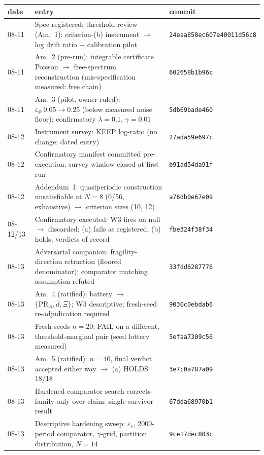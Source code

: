 \documentclass[a4paper,11pt,noarxiv]{quantumarticle}
\newcommand{\ephi}{\varepsilon_\Phi}
\begin{document}
\begin{table}[t]
\centering\footnotesize
\begin{tabular}{@{}p{1.25cm}p{9.55cm}p{2.55cm}@{}}
\toprule
date & entry & commit \\
\midrule
08-11 & Spec registered; threshold review (Am.~1): criterion-(b)
instrument $\to$ log drift ratio + calibration pilot &
\texttt{24eaa858ec60}\newline\texttt{7e40011d56c8} \\
08-11 & Am.~2 (pre-run): integrable certificate Poisson $\to$
free-spectrum reconstruction (mis-specification measured: free chain) &
\texttt{602658b1b96c} \\
08-11 & Am.~3 (pilot, owner-ruled): $\ephi\ 0.05 \to 0.25$ (below
measured noise floor); confirmatory $\lambda=0.1$, $\gamma=0.01$ &
\texttt{5db69bade460} \\
08-12 & Instrument survey: KEEP log-ratio (no change; dated entry) &
\texttt{27ada59e697c} \\
08-12 & Confirmatory manifest committed pre-execution; survey window
closed at first run & \texttt{b91ad54da91f} \\
08-12 & Addendum~1: quasiperiodic construction unsatisfiable at $N=8$
(0/56, exhaustive) $\to$ criterion sizes (10, 12) &
\texttt{a76db0e67e09} \\
08-12/13 & Confirmatory executed: W3 fires on null $\to$ discarded;
(a) fails as registered; (b) holds; verdicts of record &
\texttt{fbe324f38f34} \\
08-13 & Adversarial companion: fragility-direction retraction (floored
denominator); comparator matching assumption refuted &
\texttt{33fdd6287776} \\
08-13 & Am.~4 (ratified): battery $\to$ $\{\mathrm{PR}_A, \overline{d},
\Xi\}$; W3 descriptive; fresh-seed re-adjudication required &
\texttt{9030c0ebdab6} \\
08-13 & Fresh seeds $n=20$: FAIL on a different, threshold-marginal
pair (seed lottery measured) & \texttt{5efaa7309c56} \\
08-13 & Am.~5 (ratified): $n = 40$, final verdict accepted either way
$\to$ (a) HOLDS 18/18 & \texttt{3e7c0a787a09} \\
08-13 & Hardened comparator search corrects family-only over-claim:
single-survivor result & \texttt{67dda68970b1} \\
08-13 & Descriptive hardening sweep: $\varepsilon_c$, 2000-period
comparator, $\gamma$-grid, partition distribution, $N=14$ &
\texttt{9ce17dec803c} \\

\end{tabular}
\end{table}
\end{document}
